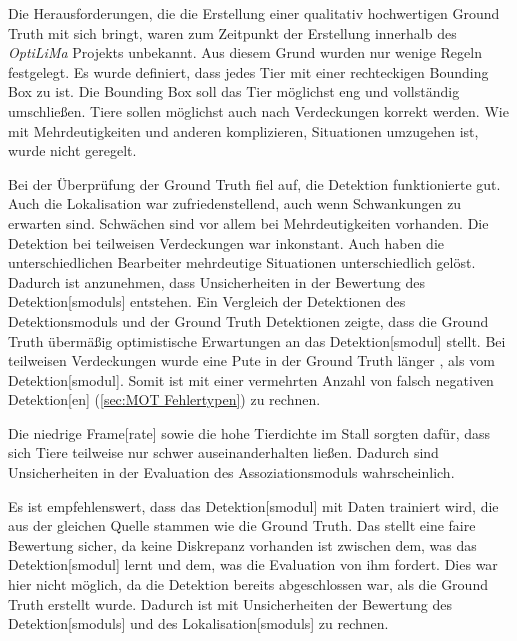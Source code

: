 Die Herausforderungen, die die Erstellung einer qualitativ hochwertigen \gls{Ground Truth} mit sich bringt, waren zum Zeitpunkt der Erstellung innerhalb des \textit{\acrshort{OptiLiMa}} Projekts unbekannt. Aus diesem Grund wurden nur wenige Regeln festgelegt. Es wurde definiert, dass jedes Tier mit einer rechteckigen \gls{Bounding Box} zu  ist. Die \gls{Bounding Box} soll das Tier möglichst eng und vollständig umschließen. Tiere sollen möglichst auch nach Verdeckungen korrekt  werden. Wie mit Mehrdeutigkeiten und anderen komplizieren, Situationen umzugehen ist, wurde nicht geregelt. \par 

Bei der Überprüfung der \gls{Ground Truth} fiel auf, die \gls{Detektion} funktionierte gut. Auch die \gls{Lokalisation} war zufriedenstellend, auch wenn Schwankungen zu erwarten sind. Schwächen sind vor allem bei Mehrdeutigkeiten vorhanden. Die \gls{Detektion} bei teilweisen Verdeckungen war inkonstant. Auch haben die unterschiedlichen Bearbeiter mehrdeutige Situationen unterschiedlich gelöst. Dadurch ist anzunehmen, dass Unsicherheiten in der Bewertung des \gls{Detektion}[smoduls] entstehen. Ein Vergleich der Detektionen des Detektionsmoduls und der Ground Truth Detektionen zeigte, dass die \gls{Ground Truth} übermäßig optimistische Erwartungen an das \gls{Detektion}[smodul] stellt. Bei teilweisen Verdeckungen wurde eine Pute in der Ground Truth länger , als vom \gls{Detektion}[smodul]. Somit ist mit einer vermehrten Anzahl von falsch negativen \gls{Detektion}[en] (\autoref{sec:MOT Fehlertypen}) zu rechnen. \par

Die niedrige \gls{Frame}[rate] sowie die hohe Tierdichte im Stall sorgten dafür, dass sich Tiere teilweise nur schwer auseinanderhalten ließen. Dadurch sind Unsicherheiten in der Evaluation des Assoziationsmoduls wahrscheinlich. 

Es ist empfehlenswert, dass das \gls{Detektion}[smodul] mit Daten trainiert wird, die aus der gleichen Quelle stammen wie die \gls{Ground Truth}. Das stellt eine faire Bewertung sicher, da keine Diskrepanz vorhanden ist zwischen dem, was das \gls{Detektion}[smodul] lernt und dem, was die Evaluation von ihm fordert. Dies war hier nicht möglich, da die \gls{Detektion} bereits abgeschlossen war, als die \gls{Ground Truth} erstellt wurde. Dadurch ist mit Unsicherheiten der Bewertung des \gls{Detektion}[smoduls] und des \gls{Lokalisation}[smoduls] zu rechnen.\par

